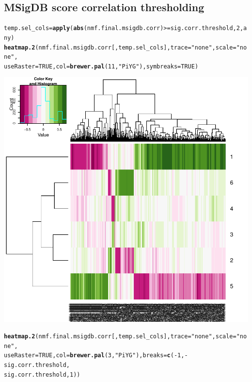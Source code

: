\documentclass{article}\usepackage[]{graphicx}\usepackage[]{color}
\makeatletter
\def\maxwidth{ %
  \ifdim\Gin@nat@width>\linewidth
    \linewidth
  \else
    \Gin@nat@width
  \fi
}
\newcommand{\hlnum}[1]{\textcolor[rgb]{0.686,0.059,0.569}{#1}}%
\newcommand{\hlstr}[1]{\textcolor[rgb]{0.192,0.494,0.8}{#1}}%
\newcommand{\hlopt}[1]{\textcolor[rgb]{0,0,0}{#1}}%
\newcommand{\hlstd}[1]{\textcolor[rgb]{0.345,0.345,0.345}{#1}}%
\newcommand{\hlkwb}[1]{\textcolor[rgb]{0.69,0.353,0.396}{#1}}%
\newcommand{\hlkwc}[1]{\textcolor[rgb]{0.333,0.667,0.333}{#1}}%
\newcommand{\hlkwd}[1]{\textcolor[rgb]{0.737,0.353,0.396}{\textbf{#1}}}%
\newenvironment{kframe}{%
 \def\at@end@of@kframe{}%
 \ifinner\ifhmode%
  \def\at@end@of@kframe{\end{minipage}}%
  \begin{minipage}{\columnwidth}%
 \fi\fi%
 \def\FrameCommand##1{\hskip\@totalleftmargin \hskip-\fboxsep
 \colorbox{shadecolor}{##1}\hskip-\fboxsep
     \hskip-\linewidth \hskip-\@totalleftmargin \hskip\columnwidth}%
 \MakeFramed {\advance\hsize-\width
   \@totalleftmargin\z@ \linewidth\hsize
   \@setminipage}}%
 {\par\unskip\endMakeFramed%
 \at@end@of@kframe}
\newenvironment{knitrout}{}{} %
\makeatother
\begin{document}
\subsection{MSigDB score correlation thresholding}
\begin{knitrout}
\color{fgcolor}\begin{kframe}
\begin{alltt}
\hlstd{temp.sel_cols} \hlkwb{=} \hlkwd{apply}\hlstd{(}\hlkwd{abs}\hlstd{(nmf.final.msigdb.corr)} \hlopt{>=} \hlstd{sig.corr.threshold,} \hlnum{2}\hlstd{, any)}
\hlkwd{heatmap.2}\hlstd{(nmf.final.msigdb.corr[, temp.sel_cols],} \hlkwc{trace} \hlstd{=} \hlstr{"none"}\hlstd{,} \hlkwc{scale} \hlstd{=} \hlstr{"none"}\hlstd{,}
    \hlkwc{useRaster} \hlstd{=} \hlnum{TRUE}\hlstd{,} \hlkwc{col} \hlstd{=} \hlkwd{brewer.pal}\hlstd{(}\hlnum{11}\hlstd{,} \hlstr{"PiYG"}\hlstd{),} \hlkwc{symbreaks} \hlstd{=} \hlnum{TRUE}\hlstd{)}
\end{alltt}
\end{kframe}

{\centering \includegraphics[width=\maxwidth]{figure/nmf-msigdb-cor-plots-1} 

}


\begin{kframe}\begin{alltt}
\hlkwd{heatmap.2}\hlstd{(nmf.final.msigdb.corr[, temp.sel_cols],} \hlkwc{trace} \hlstd{=} \hlstr{"none"}\hlstd{,} \hlkwc{scale} \hlstd{=} \hlstr{"none"}\hlstd{,}
    \hlkwc{useRaster} \hlstd{=} \hlnum{TRUE}\hlstd{,} \hlkwc{col} \hlstd{=} \hlkwd{brewer.pal}\hlstd{(}\hlnum{3}\hlstd{,} \hlstr{"PiYG"}\hlstd{),} \hlkwc{breaks} \hlstd{=} \hlkwd{c}\hlstd{(}\hlopt{-}\hlnum{1}\hlstd{,} \hlopt{-}\hlstd{sig.corr.threshold,}
        \hlstd{sig.corr.threshold,} \hlnum{1}\hlstd{))}
\end{alltt}
\end{kframe}


\end{knitrout}
\end{document}
